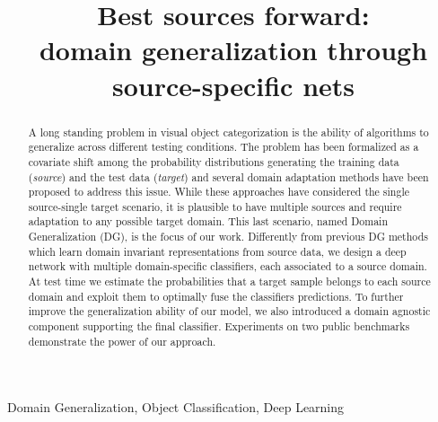 \documentclass{article}
\title{Best sources forward:\\ domain generalization through source-specific nets}
\begin{document}
\begin{titlepage}
\null
\vfill
\renewcommand{\fboxsep}{10pt}
\vfill
\clearpage
\end{titlepage}
\maketitle
\begin{abstract}
A long standing problem in visual object categorization is the ability of algorithms to generalize across different testing conditions. The problem has been formalized as a covariate shift among the probability distributions generating the training data (\textit{source}) and the test data (\textit{target}) and several domain adaptation methods have been proposed to address this issue. While these approaches have considered the single source-single target scenario, it is plausible to have multiple sources and require adaptation to any possible target domain. This last scenario, named Domain Generalization (DG), is the focus of our work. Differently from previous DG methods which learn domain invariant representations from source data, we design a deep network with multiple domain-specific classifiers, each associated to a source domain. At test time we estimate the probabilities that a target sample belongs to each source domain and exploit them to optimally fuse the classifiers predictions. To further improve the generalization ability of our model, we also introduced a domain agnostic component supporting the final classifier. 
Experiments on two public benchmarks demonstrate the power of our approach. 
\end{abstract}
\begin{keywords}
Domain Generalization, Object Classification, Deep Learning
\end{keywords}
\vspace{-0.2cm}
\end{document}
